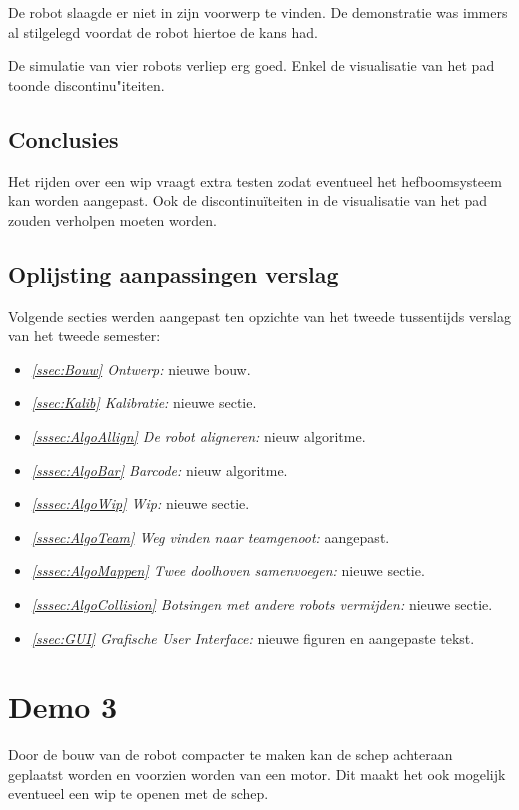 \documentclass[eind]{penoverslag}
\begin{document}
De robot slaagde er niet in zijn voorwerp te vinden. De demonstratie was immers al stilgelegd voordat de robot hiertoe de kans had.

De simulatie van vier robots verliep erg goed. Enkel de visualisatie van het pad toonde discontinu"iteiten.

\subsection{Conclusies}
\label{Assec:conc2}
Het rijden over een wip vraagt extra testen zodat eventueel het hefboomsysteem kan worden aangepast. Ook de discontinu\"iteiten in de visualisatie van het pad zouden verholpen moeten worden.

\subsection{Oplijsting aanpassingen verslag}
\label{Assec:aanp2}
Volgende secties werden aangepast ten opzichte van het tweede tussentijds verslag van het tweede semester:

\begin{itemize}
\item \textit{\ref{ssec:Bouw} Ontwerp:} nieuwe bouw.
\item \textit{\ref{ssec:Kalib} Kalibratie:} nieuwe sectie.
\item \textit{\ref{sssec:AlgoAllign} De robot aligneren:} nieuw algoritme.
\item \textit{\ref{sssec:AlgoBar} Barcode:} nieuw algoritme.
\item \textit{\ref{sssec:AlgoWip} Wip:} nieuwe sectie.
\item \textit{\ref{sssec:AlgoTeam} Weg vinden naar teamgenoot:} aangepast.
\item \textit{\ref{sssec:AlgoMappen} Twee doolhoven samenvoegen:} nieuwe sectie.
\item \textit{\ref{sssec:AlgoCollision} Botsingen met andere robots vermijden:} nieuwe sectie.
\item \textit{\ref{ssec:GUI} Grafische User Interface:} nieuwe figuren en aangepaste tekst.
\end{itemize}

\section{Demo 3}
\label{Asec:demo3}
Door de bouw van de robot compacter te maken kan de schep achteraan geplaatst worden en voorzien worden van een motor. Dit maakt het ook mogelijk eventueel een wip te openen met de schep.
\end{document}
